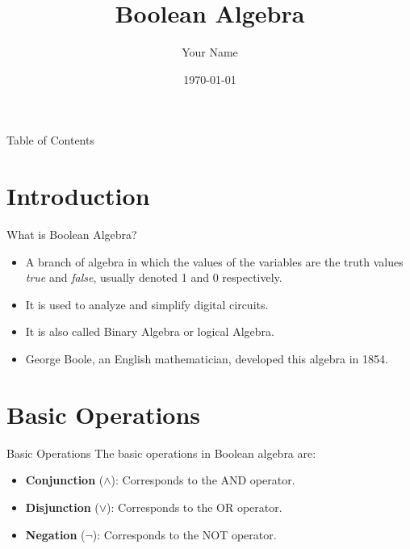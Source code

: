 \documentclass{beamer}
\title{Boolean Algebra}
\author{Your Name}
\date{\today}
\begin{document}
\begin{frame}
    \titlepage
\end{frame}

\begin{frame}{Table of Contents}
    \tableofcontents
\end{frame}

\section{Introduction}
\begin{frame}{What is Boolean Algebra?}
    \begin{itemize}
        \item A branch of algebra in which the values of the variables are the truth values \textit{true} and \textit{false}, usually denoted 1 and 0 respectively.
        \item It is used to analyze and simplify digital circuits.
        \item It is also called Binary Algebra or logical Algebra.
        \item George Boole, an English mathematician, developed this algebra in 1854.
    \end{itemize}
\end{frame}

\section{Basic Operations}
\begin{frame}{Basic Operations}
    The basic operations in Boolean algebra are:
    \begin{itemize}
        \item \textbf{Conjunction} ($\land$): Corresponds to the AND operator.
        \item \textbf{Disjunction} ($\lor$): Corresponds to the OR operator.
        \item \textbf{Negation} ($\neg$): Corresponds to the NOT operator.
    \end{itemize}
\end{frame}
\end{document}
